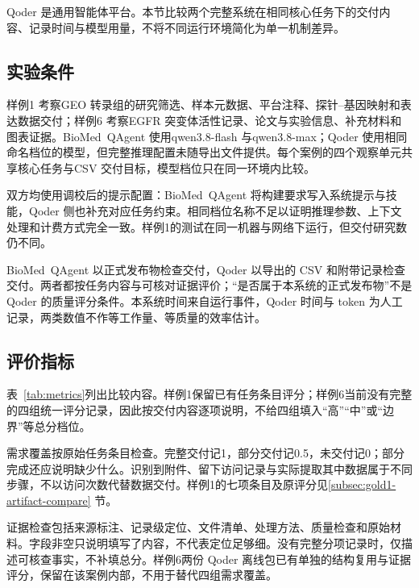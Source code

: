 Qoder 是通用智能体平台\cite{qoder}。本节比较两个完整系统在相同核心任务下的交付内容、记录时间与模型用量，不将不同运行环境简化为单一机制差异。

\subsection{实验条件}

样例1 考察GEO 转录组的研究筛选、样本元数据、平台注释、探针–基因映射和表达数据交付；样例6 考察EGFR 突变体活性记录、论文与实验信息、补充材料和图表证据。\mbox{BioMed QAgent} 使用qwen3.8-flash 与qwen3.8-max；Qoder 使用相同命名档位的模型，但完整推理配置未随导出文件提供。每个案例的四个观察单元共享核心任务与CSV 交付目标，模型档位只在同一环境内比较。

双方均使用调校后的提示配置：\mbox{BioMed QAgent} 将构建要求写入系统提示与技能，Qoder 侧也补充对应任务约束。相同档位名称不足以证明推理参数、上下文处理和计费方式完全一致。样例1的测试在同一机器与网络下运行，但交付研究数仍不同。

\mbox{BioMed QAgent} 以正式发布物检查交付，Qoder 以导出的 CSV 和附带记录检查交付。两者都按任务内容与可核对证据评价；“是否属于本系统的正式发布物”不是 Qoder 的质量评分条件。本系统时间来自运行事件，Qoder 时间与 token 为人工记录，两类数值不作等工作量、等质量的效率估计。

\subsection{评价指标}\label{sec:comparison-metrics}

表~\ref{tab:metrics}列出比较内容。样例1保留已有任务条目评分；样例6当前没有完整的四组统一评分记录，因此按交付内容逐项说明，不给四组填入“高”“中”或“边界”等总分档位。

需求覆盖按原始任务条目检查。完整交付记1，部分交付记0.5，未交付记0；部分完成还应说明缺少什么。识别到附件、留下访问记录与实际提取其中数据属于不同步骤，不以访问次数代替数据交付。样例1的七项条目及原评分见\ref{subsec:gold1-artifact-compare} 节。

证据检查包括来源标注、记录级定位、文件清单、处理方法、质量检查和原始材料。字段非空只说明填写了内容，不代表定位足够细。没有完整分项记录时，仅描述可核查事实，不补填总分。样例6两份 Qoder 离线包已有单独的结构复用与证据评分，保留在该案例内部，不用于替代四组需求覆盖。

